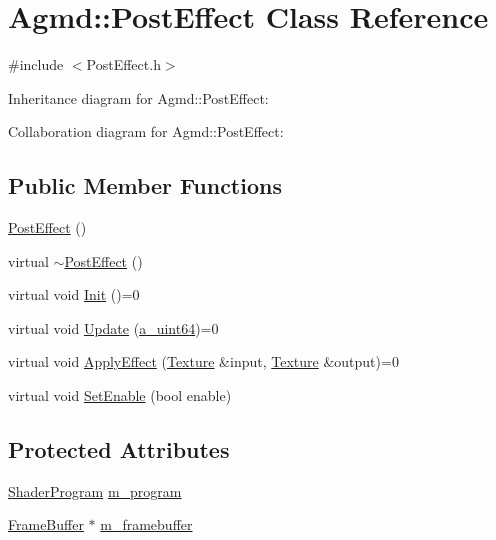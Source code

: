 \hypertarget{class_agmd_1_1_post_effect}{\section{Agmd\+:\+:Post\+Effect Class Reference}
\label{class_agmd_1_1_post_effect}
}


{\ttfamily \#include $<$Post\+Effect.\+h$>$}



Inheritance diagram for Agmd\+:\+:Post\+Effect\+:


Collaboration diagram for Agmd\+:\+:Post\+Effect\+:
\subsection*{Public Member Functions}
\begin{DoxyCompactItemize}
\item 
\hyperlink{class_agmd_1_1_post_effect_a4e4092d7237f6992a339f186a9b4a033}{Post\+Effect} ()
\item 
virtual \hyperlink{class_agmd_1_1_post_effect_a0b7086103d480850b0d0f0c7833de85f}{$\sim$\+Post\+Effect} ()
\item 
virtual void \hyperlink{class_agmd_1_1_post_effect_a0fc04d1fa9c626d7afd1bb3ad9650fc7}{Init} ()=0
\item 
virtual void \hyperlink{class_agmd_1_1_post_effect_a7fa3e1ad3a588dce0f9f51db8b420c91}{Update} (\hyperlink{_common_defines_8h_a6c5192ec3c55d6e5b13d2dbaa082bdea}{a\+\_\+uint64})=0
\item 
virtual void \hyperlink{class_agmd_1_1_post_effect_a853f68fdefbb0450851bc8f4539ec4db}{Apply\+Effect} (\hyperlink{class_agmd_1_1_texture}{Texture} \&input, \hyperlink{class_agmd_1_1_texture}{Texture} \&output)=0
\item 
virtual void \hyperlink{class_agmd_1_1_post_effect_a0b880bab27c99b780712ac1d93a92307}{Set\+Enable} (bool enable)
\end{DoxyCompactItemize}
\subsection*{Protected Attributes}
\begin{DoxyCompactItemize}
\item 
\hyperlink{class_agmd_1_1_shader_program}{Shader\+Program} \hyperlink{class_agmd_1_1_post_effect_af0555b6dbaa69901d113e8b88353c160}{m\+\_\+program}
\item 
\hyperlink{class_agmd_1_1_frame_buffer}{Frame\+Buffer} $\ast$ \hyperlink{class_agmd_1_1_post_effect_a13821c8d90685a9f75609d21953c3dab}{m\+\_\+framebuffer}
\end{DoxyCompactItemize}


